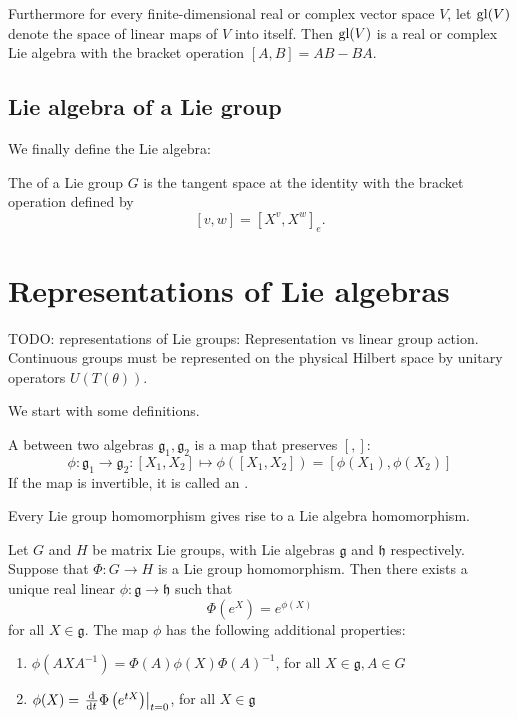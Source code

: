 Furthermore for every finite-dimensional real or complex vector space $V$, let $\operatorname{gl}(V)$ denote the space of linear maps of $V$ into itself. Then $\operatorname{gl}(V)$ is a real or complex Lie algebra with the bracket operation $[A,B] = AB - BA$.

\subsection{Lie algebra of a Lie group}

We finally define the Lie algebra:
\begin{definition}
The  of a Lie group $G$ is the tangent space at the identity with the bracket operation defined by
\[ [v,w] = [X^v, X^w]_e. \]
\end{definition}



\section{Representations of Lie algebras}
TODO: representations of Lie groups: Representation vs linear group action. Continuous groups must be represented on the physical Hilbert space by unitary operators $U(T(\theta))$.


We start with some definitions.

\begin{definition}
A  between two algebras $\mathfrak{g}_1, \mathfrak{g}_2$ is a map that preserves $[,]$:
\[ \phi: \mathfrak{g}_1 \to \mathfrak{g}_2: [X_1,X_2] \mapsto \phi([X_1,X_2]) = [\phi(X_1), \phi(X_2)] \]
If the map is invertible, it is called an .
\end{definition}

Every Lie group homomorphism gives rise to a Lie algebra homomorphism.
\begin{eigenschap}
Let $G$ and $H$ be matrix Lie groups, with Lie algebras $\mathfrak{g}$ and $\mathfrak{h}$ respectively. Suppose that $\Phi: G \to H$ is a Lie group homomorphism. Then there exists a unique real linear  $\phi: \mathfrak{g} \to \mathfrak{h}$ such that
\[\Phi\left(e^{X}\right) = e^{\phi(X)}\]
for all $X \in \mathfrak{g}$. The map $\phi$ has the following additional properties:
\begin{enumerate}
\item $\phi\left(AXA^{-1}\right) = \Phi(A)\phi(X)\Phi(A)^{-1}$, for all $X\in\mathfrak{g}, A \in G$
\item $\phi(X) = \left.\od{}{t}\Phi \left(e^{tX}\right)\right|_{t=0}$, for all $X \in \mathfrak{g}$
\end{enumerate}
\end{eigenschap}

